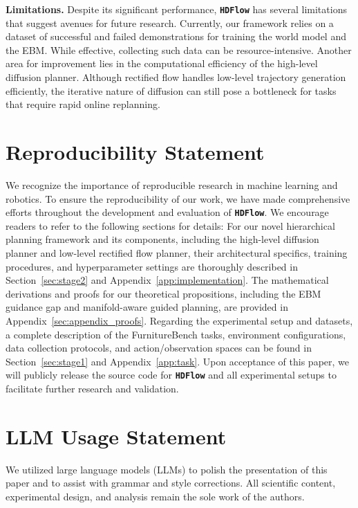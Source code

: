 \documentclass{article} %
\begin{document}
\textbf{Limitations.} Despite its significant performance, \texttt{\textbf{HDFlow}} has several limitations that suggest avenues for future research. Currently, our framework relies on a dataset of successful and failed demonstrations for training the world model and the EBM. While effective, collecting such data can be resource-intensive. Another area for improvement lies in the computational efficiency of the high-level diffusion planner. Although rectified flow handles low-level trajectory generation efficiently, the iterative nature of diffusion can still pose a bottleneck for tasks that require rapid online replanning.


\newpage
\section*{Reproducibility Statement}
We recognize the importance of reproducible research in machine learning and robotics. To ensure the reproducibility of our work, we have made comprehensive efforts throughout the development and evaluation of \textbf{\texttt{HDFlow}}. We encourage readers to refer to the following sections for details:
For our novel hierarchical planning framework and its components, including the high-level diffusion planner and low-level rectified flow planner, their architectural specifics, training procedures, and hyperparameter settings are thoroughly described in Section~\ref{sec:stage2} and Appendix~\ref{app:implementation}. The mathematical derivations and proofs for our theoretical propositions, including the EBM guidance gap and manifold-aware guided planning, are provided in Appendix~\ref{sec:appendix_proofs}. Regarding the experimental setup and datasets, a complete description of the FurnitureBench tasks, environment configurations, data collection protocols, and action/observation spaces can be found in Section~\ref{sec:stage1} and Appendix~\ref{app:task}.
Upon acceptance of this paper, we will publicly release the source code for \textbf{\texttt{HDFlow}} and all experimental setups to facilitate further research and validation.

\section*{LLM Usage Statement}
We utilized large language models (LLMs) to polish the presentation of this paper and to assist with grammar and style corrections. All scientific content, experimental design, and analysis remain the sole work of the authors.
\end{document}
